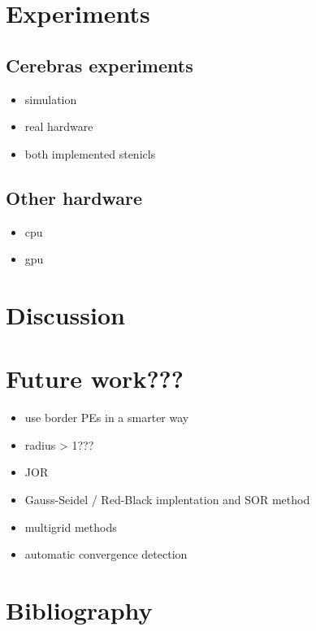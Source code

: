 \documentclass{article}
\begin{document}
\section{Experiments}
\subsection{Cerebras experiments}

\begin{itemize}
    \item simulation
    \item real hardware
    \item both implemented stenicls
\end{itemize}
\subsection{Other hardware}
\begin{itemize}
    \item cpu
    \item gpu
\end{itemize}
\section{Discussion}
\section{Future work???}
\begin{itemize}
    \item use border PEs in a smarter way
    \item radius > 1???
    \item JOR
    \item Gauss-Seidel / Red-Black implentation and SOR method
    \item multigrid methods
    \item automatic convergence detection
\end{itemize}

\section{Bibliography}
\end{document}
